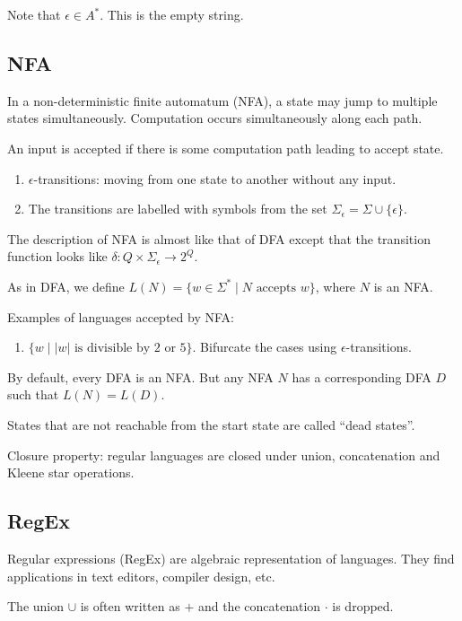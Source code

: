 \documentclass{article}
\begin{document}
Note that $\epsilon \in A^{*}$. This is the empty string.

\subsection{NFA}

In a non-deterministic finite automatum (NFA), a state may jump to multiple states simultaneously. Computation occurs simultaneously along each path.

An input is accepted if there is some computation path leading to accept state.

\begin{enumerate}
\item\label{item:10} $\epsilon$-transitions: moving from one state to another without any input. 
\item\label{item:5} The transitions are labelled with symbols from the set $\Sigma_{\epsilon} = \Sigma \cup \{\epsilon\}$.
\end{enumerate}

The description of NFA is almost like that of DFA except that the transition function looks like $\delta: Q \times \Sigma_{\epsilon} \to 2^Q$.

As in DFA, we define $L(N) = \{w \in \Sigma^{*} \mid N \text{ accepts } w \}$, where $N$ is an NFA.

Examples of languages accepted by NFA: 
\begin{enumerate}
\item\label{item:11} $\{ w \mid |w| \text{ is divisible by } 2 \text{ or } 5 \}$. Bifurcate the cases using $\epsilon$-transitions.
\end{enumerate}

By default, every DFA is an NFA. But any NFA $N$ has a corresponding DFA $D$ such that $L(N) = L(D)$.

States that are not reachable from the start state are called ``dead states''.

Closure property: regular languages are closed under union, concatenation and Kleene star operations.

\subsection{RegEx}

Regular expressions (RegEx) are algebraic representation of languages. They find applications in text editors, compiler design, etc.

The union $\cup$ is often written as $+$ and the concatenation $\cdot$ is dropped.
\end{document}
